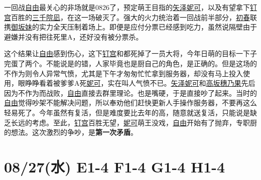 
一回战\uline{自由}最关心的非场就是0826了，预定萌王目指的\uline{矢泽妮可}，以及有望拿下\uline{钉宫}百胜的\uline{三千院凪}，在这一场破灭了。强大的火力统治着一回战前半部分，\uline{初春}联携\uline{御坂妹}的实力全天压制着场上。即便是应付分票已经感到吃力，虽然说隔壁由于避嫌并没有把往死里A，还好没有被分票杀。

这个结果让\uline{自由}感到伤心，这下\uline{钉宫}和都死掉了一员大将，今年日萌的目标一下子完蛋了两个。不能说是的错，人家毕竟也是厨自己的角色，是正确的。但是这场的不作为则令人异常气愤，尤其是下午才匆匆忙忙拿到服务器，却没有马上投入使用，眼睁睁看着被爹爹A死\uline{妮可}，实在叫人气愤不已。\uline{矢泽妮可}和\uline{高坂穗乃果}先后因为不作为而战败，\uline{自由}直接去群里理论。也是嘴硬，于是直接吵了起来。当时的\uline{自由}觉得吵架不能解决问题，所以奉劝他们赶快更新人手操作服务器，不要再这么轻易死了。今年虽然有复活，但是难度要比去年的高，随意就送复活，只能说是缺乏长远的考虑。至此，\uline{钉宫}百胜无望，\uline{妮可}萌王没戏，\uline{自由}开始有了抛弃，专职厨的想法。这次激烈的争吵，是\textbf{第一次矛盾}。

\section{08/27(水) E1-4 F1-4 G1-4 H1-4}


